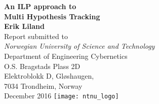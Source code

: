 \begin{titlepage}
\begin{center}
 {\huge\bfseries An ILP approach to \\ Multi Hypothesis Tracking\\}
 \vspace{1.5cm}
 {\Large\bfseries Erik Liland}\\[5pt]
 \vspace{2cm}
{Report  submitted to} \\[5pt]
\emph{{Norwegian University of Science and Technology}}\\[2cm]

 \vfill
{Department of Engineering Cybernetics}\\[5pt]
{O.S. Bragstads Plass 2D}\\[5pt]
{Elektroblokk D, Gløshaugen,\\
7034 Trondheim, Norway}\\
\vfill
{December 2016}
\vfill
\texttt{[image: ntnu\_logo]}\\[5pt]
\end{center}
\end{titlepage}
\newpage